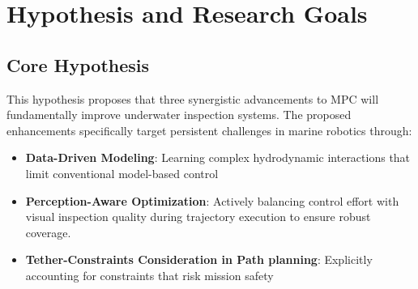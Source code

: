 


\section{Hypothesis and Research Goals}

\subsection{Core Hypothesis}
\begin{figure}[h!]
    \centering
    
    \label{fig:revised_hypothesis_separate}
\end{figure}

This hypothesis proposes that three synergistic advancements to \ac{MPC} will fundamentally improve underwater inspection systems. The proposed enhancements specifically target persistent challenges in marine robotics through:

\begin{itemize}
\item \textbf{Data-Driven Modeling}: Learning complex hydrodynamic interactions that limit conventional model-based control
\item \textbf{Perception-Aware Optimization}: Actively balancing control effort with visual inspection quality during trajectory execution to ensure robust coverage.
\item \textbf{Tether-Constraints Consideration in Path planning}: Explicitly accounting for constraints that risk mission safety
\end{itemize}

